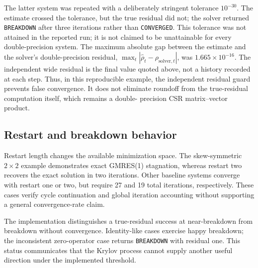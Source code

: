 The latter system was repeated with a deliberately stringent tolerance
$10^{-30}$. The estimate crossed the tolerance, but the true residual did not;
the solver returned \texttt{BREAKDOWN} after three iterations rather than
\texttt{CONVERGED}. This tolerance was not attained in the reported run; it is
not claimed to be unattainable for every double-precision system. The maximum
absolute gap between the estimate and the solver's double-precision residual,
$\max_t|\widehat{\rho}_t-\rho_{\mathrm{solver},t}|$, was
$1.665\times10^{-16}$. The independent wide residual is the final value quoted
above, not a history recorded at each step. Thus, in this reproducible example,
the independent residual guard prevents false convergence. It does not eliminate
roundoff from the true-residual computation itself, which remains a double-
precision CSR matrix--vector product.

\subsection{Restart and breakdown behavior}

Restart length changes the available minimization space. The skew-symmetric
$2\times2$ example demonstrates exact GMRES(1) stagnation, whereas restart two
recovers the exact solution in two iterations. Other baseline systems converge
with restart one or two, but require 27 and 19 total iterations, respectively.
These cases verify cycle continuation and global iteration accounting without
supporting a general convergence-rate claim.

The implementation distinguishes a true-residual success at near-breakdown from
breakdown without convergence. Identity-like cases exercise happy breakdown; the
inconsistent zero-operator case returns \texttt{BREAKDOWN} with residual one.
This status communicates that the Krylov process cannot supply another useful
direction under the implemented threshold.
